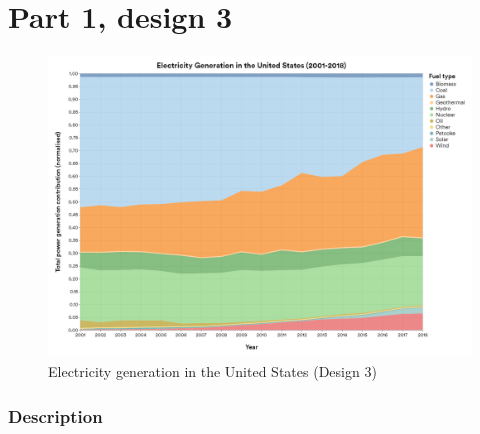 \hypertarget{part-1-design-3}{
\section{Part 1, design 3}\label{part-1-design-3}}

\begin{figure}[ht]
  \centering
  \includegraphics[width=\textwidth]{../img/design3}
  \caption{Electricity generation in the United States (Design 3)}
\end{figure}

\hypertarget{description}{
\subsubsection{Description}\label{description}}

